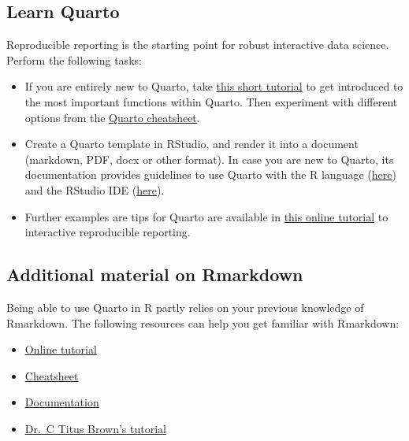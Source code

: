 \documentclass[
]{book}
\providecommand{\tightlist}{%
  \setlength{\itemsep}{0pt}\setlength{\parskip}{0pt}}
\begin{document}
\hypertarget{learn-quarto}{%
\subsection{Learn Quarto}\label{learn-quarto}}

Reproducible reporting is the starting point for robust interactive
data science. Perform the following tasks:

\begin{itemize}
\item
  If you are entirely new to Quarto, take
  \href{https://quarto.org/docs/get-started/hello/rstudio.html}{this short tutorial}
  to get introduced to the most important functions within Quarto.
  Then experiment with different options from the
  \href{https://res.cloudinary.com/dyd911kmh/image/upload/v1676540721/Marketing/Blog/Quarto_Cheat_Sheet.pdf}{Quarto cheatsheet}.
\item
  Create a Quarto template in RStudio, and render it into a
  document (markdown, PDF, docx or other format). In case you are new
  to Quarto, its documentation provides guidelines to use Quarto with the
  R language (\href{https://quarto.org/docs/computations/r.html}{here})
  and the RStudio IDE (\href{https://quarto.org/docs/tools/rstudio.html}{here}).
\item
  Further examples are tips for Quarto are available in \href{https://appsilon.com/r-quarto-tutorial/}{this online tutorial}
  to interactive reproducible reporting.
\end{itemize}

\hypertarget{additional-material-on-rmarkdown}{%
\subsection{Additional material on Rmarkdown}\label{additional-material-on-rmarkdown}}

Being able to use Quarto in R partly relies on your previous knowledge of Rmarkdown. The following resources can help you get familiar with Rmarkdown:

\begin{itemize}
\tightlist
\item
  \href{https://www.markdowntutorial.com/}{Online tutorial}
\item
  \href{https://www.rstudio.com/wp-content/uploads/2015/02/rmarkdown-cheatsheet.pdf}{Cheatsheet}
\item
  \href{https://rmarkdown.rstudio.com/lesson-1.html}{Documentation}
\item
  \href{https://rpubs.com/marschmi/RMarkdown}{Dr.~C Titus Brown's tutorial}
\end{itemize}
\end{document}
